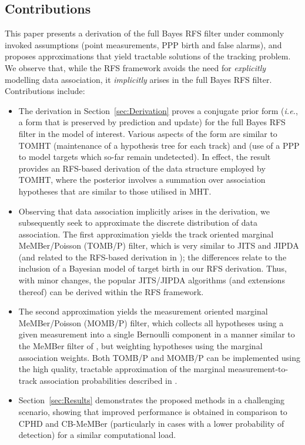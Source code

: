 \documentclass[journal,twoside]{IEEEtran}
\theoremstyle{plain}
\begin{document}
\subsection{Contributions}
\label{ss:Contributions}
%
This paper presents a derivation of the full Bayes RFS filter under commonly invoked assumptions (point measurements, PPP birth and false alarms), and proposes approximations that yield tractable solutions of the tracking problem. We observe that, while the RFS framework avoids the need for \emph{explicitly} modelling data association, it \emph{implicitly} arises in the full Bayes RFS filter. Contributions include:
%
\begin{itemize}
\item The derivation in Section~\ref{sec:Derivation} proves a conjugate prior form (\textit{i.e.}\xspace, a form that is preserved by prediction and update) for the full Bayes RFS filter in the model of interest. Various aspects of the form are similar to TOMHT (maintenance of a hypothesis tree for each track) and \cite{MorCho86} (use of a PPP to model targets which so-far remain undetected). In effect, the result provides an RFS-based derivation of the data structure employed by TOMHT, where the posterior involves a summation over association hypotheses that are similar to those utilised in MHT.
%
\item Observing that data association implicitly arises in the derivation, we subsequently seek to approximate the discrete distribution of data association. The first approximation yields the track oriented marginal MeMBer/Poisson (TOMB/P) filter, which is very similar to JITS and JIPDA (and related to the RFS-based derivation in \cite{MorCha03}); the differences relate to the inclusion of a Bayesian model of target birth in our RFS derivation. Thus, with minor changes, the popular JITS/JIPDA algorithms (and extensions thereof) can be derived within the RFS framework.
%
\item The second approximation yields the measurement oriented marginal MeMBer/Poisson (MOMB/P) filter, which collects all hypotheses using a given measurement into a single Bernoulli component in a manner similar to the MeMBer filter of \cite{Mah07,VoVo09}, but weighting hypotheses using the marginal association weights. Both TOMB/P and MOMB/P can be implemented using the high quality, tractable approximation of the marginal measurement-to-track association probabilities described in \cite{WilLau12}.
%
\item Section~\ref{sec:Results} demonstrates the proposed methods in a challenging scenario, showing that improved performance is obtained in comparison to CPHD and CB-MeMBer (particularly in cases with a lower probability of detection) for a similar computational load.
\end{itemize}
\end{document}
